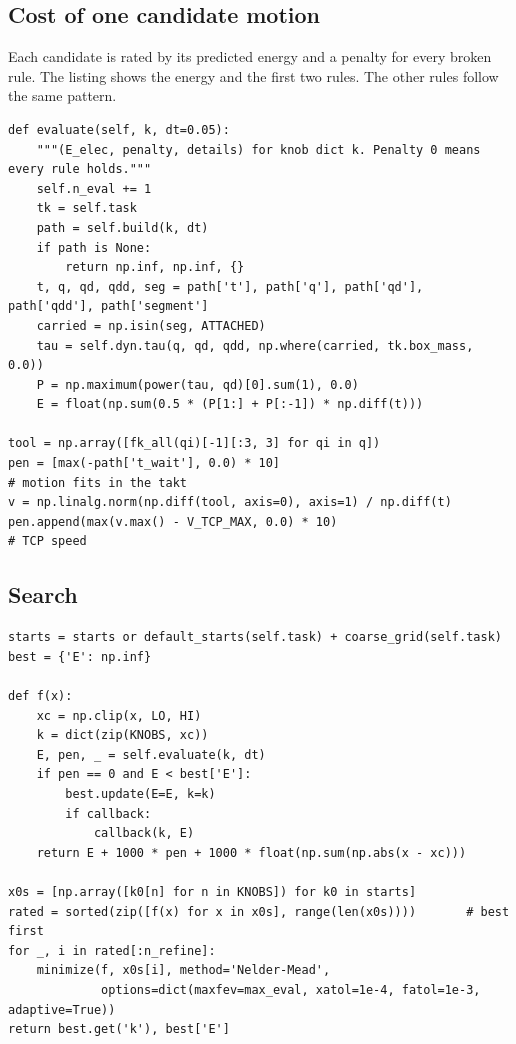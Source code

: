 \documentclass[12pt,a4paper]{article}
\begin{document}
\subsection{Cost of one candidate motion}

Each candidate is rated by its predicted energy and a penalty for every broken rule. The listing shows the energy and the first two rules. The other rules follow the same pattern.

\begin{lstlisting}[caption={Energy and first rules (\texttt{energy\_opt.py}, \texttt{Planner.evaluate})}]
def evaluate(self, k, dt=0.05):
    """(E_elec, penalty, details) for knob dict k. Penalty 0 means every rule holds."""
    self.n_eval += 1
    tk = self.task
    path = self.build(k, dt)
    if path is None:
        return np.inf, np.inf, {}
    t, q, qd, qdd, seg = path['t'], path['q'], path['qd'], path['qdd'], path['segment']
    carried = np.isin(seg, ATTACHED)
    tau = self.dyn.tau(q, qd, qdd, np.where(carried, tk.box_mass, 0.0))
    P = np.maximum(power(tau, qd)[0].sum(1), 0.0)
    E = float(np.sum(0.5 * (P[1:] + P[:-1]) * np.diff(t)))

tool = np.array([fk_all(qi)[-1][:3, 3] for qi in q])
pen = [max(-path['t_wait'], 0.0) * 10]                                  # motion fits in the takt
v = np.linalg.norm(np.diff(tool, axis=0), axis=1) / np.diff(t)
pen.append(max(v.max() - V_TCP_MAX, 0.0) * 10)                          # TCP speed
\end{lstlisting}

\subsection{Search}

\begin{lstlisting}[caption={Rate all starts, then refine the best (\texttt{energy\_opt.py}, \texttt{Planner.optimize})}]
starts = starts or default_starts(self.task) + coarse_grid(self.task)
best = {'E': np.inf}

def f(x):
    xc = np.clip(x, LO, HI)
    k = dict(zip(KNOBS, xc))
    E, pen, _ = self.evaluate(k, dt)
    if pen == 0 and E < best['E']:
        best.update(E=E, k=k)
        if callback:
            callback(k, E)
    return E + 1000 * pen + 1000 * float(np.sum(np.abs(x - xc)))

x0s = [np.array([k0[n] for n in KNOBS]) for k0 in starts]
rated = sorted(zip([f(x) for x in x0s], range(len(x0s))))       # best first
for _, i in rated[:n_refine]:
    minimize(f, x0s[i], method='Nelder-Mead',
             options=dict(maxfev=max_eval, xatol=1e-4, fatol=1e-3, adaptive=True))
return best.get('k'), best['E']
\end{lstlisting}
\end{document}
